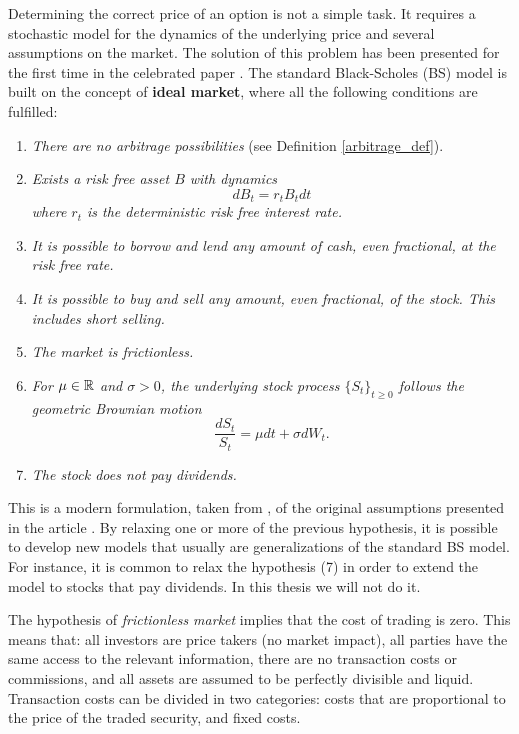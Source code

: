 Determining the correct price of an option is not a simple task. 
It requires a stochastic model for the dynamics of the underlying price and several assumptions on the market.
The solution of this problem has been presented for the first time in the celebrated paper \cite{BS73}. 
The standard Black-Scholes (BS) model is built on the concept of \textbf{ideal market}, where all the following 
conditions are fulfilled:
\begin{enumerate}
 \item \emph{There are no arbitrage possibilities} (see Definition \ref{arbitrage_def}).
 \item \emph{Exists a risk free asset $B$ with dynamics
        \begin{equation}
         dB_t = r_t B_t dt
        \end{equation}
        where $r_t$ is the deterministic risk free interest rate.}
 \item \emph{It is possible to borrow and lend any amount of cash, even fractional, at the risk free rate.}
 \item \emph{It is possible to buy and sell any amount, even fractional, of the stock. This includes short selling.}
 \item \emph{The market is frictionless.}
 \item \emph{For $\mu \in \mathbb{R}$ and $\sigma > 0$, the underlying stock process $\{S_t\}_{t\geq 0}$ follows the geometric Brownian motion}
	\begin{equation}\label{GBM2}
	  \frac{dS_t}{S_t} = \mu dt + \sigma dW_t.
	\end{equation}
\item \emph{The stock does not pay dividends.}	
\end{enumerate}

This is a modern formulation, taken from \cite{Musiela}, of the original assumptions presented in the article \cite{BS73}.
By relaxing one or more of the previous hypothesis, it is possible to develop new models that usually are generalizations of the standard BS model. 
For instance, it is common to relax the hypothesis (7) in order to extend the model to stocks that pay dividends. In this thesis we will not do it.

The hypothesis of \emph{frictionless market} implies that the cost of trading is zero. This means that: all investors are price takers (no market impact), 
all parties have the same access to the relevant information, there are no transaction costs or commissions, and all assets are
assumed to be perfectly divisible and liquid.
Transaction costs can be divided in two categories: costs that are proportional to the price of the traded security, and fixed costs. 

